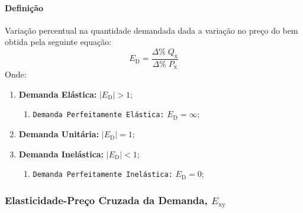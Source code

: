 \documentclass{article}
\begin{document}
            \paragraph{Definição}Variação percentual na quantidade demandada dada a variação no preço do bem obtida pela seguinte equação:
                \begin{equation}
                    \boxed{
                        E_{\text{D}} = 
                        \frac{\Delta\%\;Q_{\text{x}}}{\Delta\%\;P_{\text{x}}}
                    }
                \end{equation}
            Onde:
                \begin{enumerate}[noitemsep]
                    \item \textbf{Demanda Elástica:} $|E_{\text{D}}| > 1$;
                        \begin{enumerate}
                            \item \texttt{Demanda Perfeitamente Elástica:} $E_{\text{D}} = \infty$;
                        \end{enumerate}

                    \item \textbf{Demanda Unitária:} $|E_{\text{D}}| = 1$;

                    \item \textbf{Demanda Inelástica:} $|E_{\text{D}}| < 1$;
                        \begin{enumerate}
                            \item \texttt{Demanda Perfeitamente Inelástica:} $E_{\text{D}} = 0$;
                        \end{enumerate}
                \end{enumerate}

        \subsubsection{Elasticidade-Preço Cruzada da Demanda, $E_{\text{xy}}$}
\end{document}
